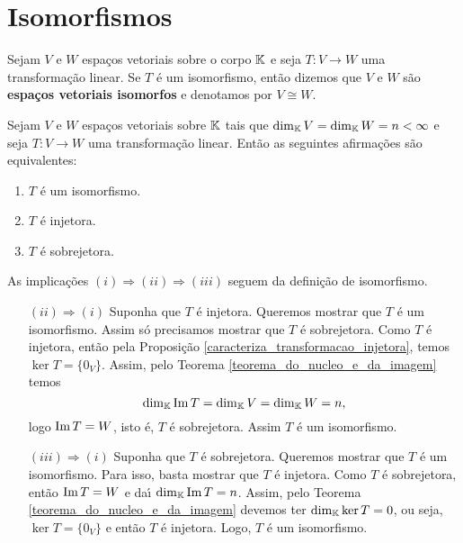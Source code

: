 \section{Isomorfismos}

\begin{definicao}
	Sejam $V$ e $W$ espa\c{c}os vetoriais sobre o corpo $\mathbb{K}$ e seja $T : V \to W$ uma transforma\c{c}\~ao linear. Se $T$ \'e um isomorfismo, ent\~ao dizemos que $V$ e $W$ s\~ao \textbf{espa\c{c}os vetoriais isomorfos} e denotamos por $V \cong W$.
\end{definicao}

\begin{proposicao}\label{equivalencia_isomorfismo_dimensao_finita}
	Sejam $V$ e $W$ espa\c{c}os vetoriais sobre $\mathbb{K}$ tais que $\dim_{\mathbb{K}}V = \dim_{\mathbb{K}}W = n < \infty$ e seja $T : V \to W$ uma transforma\c{c}\~ao linear. Ent\~ao as seguintes afirma\c{c}\~oes s\~ao equivalentes:
	\begin{enumerate}
		\item $T$ \'e um isomorfismo.
		\item $T$ \'e injetora.
		\item $T$ \'e sobrejetora.
	\end{enumerate}
\end{proposicao}
\begin{prova}
	As implica\c{c}\~oes $(i) \Rightarrow (ii) \Rightarrow (iii)$ seguem da defini\c{c}\~ao de isomorfismo.
	\begin{enumerate}
		\item[$(ii) \Rightarrow (i)$] Suponha que $T$ \'e injetora. Queremos mostrar que $T$ \'e um isomorfismo. Assim s\'o precisamos mostrar que $T$ \'e sobrejetora. Como $T$ \'e injetora, ent\~ao pela Proposi\c{c}\~ao \ref{caracteriza_transformacao_injetora}, temos $\ker T = \{0_V\}$. Assim, pelo Teorema \ref{teorema_do_nucleo_e_da_imagem} temos
		\[
			\dim_{\mathbb{K}}{\rm Im\,} T = \dim_{\mathbb{K}}V = \dim_{\mathbb{K}}W = n,
		\]
		logo ${\rm Im\,} T = W$, isto \'e, $T$ \'e sobrejetora. Assim $T$ \'e um isomorfismo.

		\item[$(iii) \Rightarrow (i)$] Suponha que $T$ \'e sobrejetora. Queremos mostrar que $T$ \'e um isomorfismo. Para isso, basta mostrar que $T$ \'e injetora. Como $T$ \'e sobrejetora, ent\~ao ${\rm Im\,} T = W$ e da{\'\i} $\dim_{\mathbb{K}}{\rm Im\,} T = n$. Assim, pelo Teorema \ref{teorema_do_nucleo_e_da_imagem} devemos ter $\dim_{\mathbb{K}}\ker T = 0$, ou seja, $\ker T = \{0_V\}$ e ent\~ao $T$ \'e injetora. Logo, $T$ \'e um isomorfismo.
	\end{enumerate}
\end{prova}

